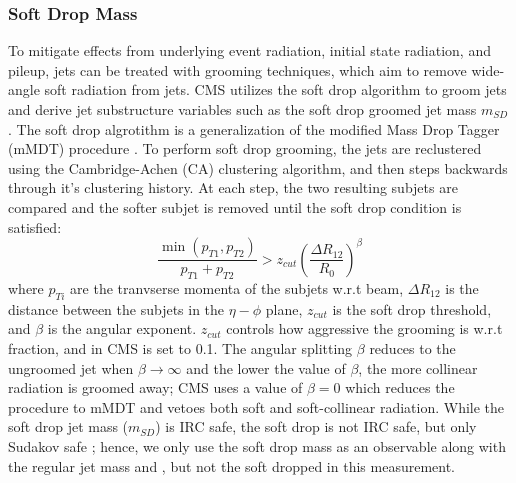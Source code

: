 \subsubsection{Soft Drop Mass}
To mitigate effects from underlying event radiation, initial state radiation, and pileup, jets can be treated with grooming techniques, which aim to remove wide-angle soft  radiation from jets. CMS utilizes the soft drop algorithm \cite{softdrop} to groom jets and derive jet substructure variables such as the soft drop groomed jet mass $m_{SD}$. The soft drop algrotithm is a generalization of the modified Mass Drop Tagger (mMDT) procedure \cite{mMDT}. To perform soft drop grooming, the jets are reclustered using the Cambridge-Achen (CA) \cite{CA} clustering algorithm, and then steps backwards through it's clustering history. At each step, the two resulting subjets are compared and the softer subjet is removed until the soft drop condition is satisfied:
\begin{equation}
\frac{\min(p_{T1},p_{T2})}{p_{T1}+p_{T2}}>z_{cut}\left(\frac{\Delta R_{12}}{R_0}\right)^\beta
\end{equation}
where $p_{Ti}$ are the tranvserse momenta of the subjets w.r.t beam, $\Delta R_{12}$ is the distance between the subjets in the $\eta-\phi$ plane, $z_{cut}$ is the soft drop threshold, and $\beta$ is the angular exponent. $z_{cut}$ controls how aggressive the grooming is w.r.t \pt fraction, and in CMS is set to 0.1. The angular splitting $\beta$ reduces to the ungroomed jet when $\beta\rightarrow\infty$ and the lower the value of $\beta$, the more collinear radiation is groomed away; CMS uses a value of $\beta=0$ which reduces the procedure to mMDT and vetoes both soft and soft-collinear radiation. While the soft drop jet mass ($m_{SD}$) is IRC safe, the soft drop \pt is not IRC safe, but only Sudakov safe \cite{advancesInJet}; hence, we only use the soft drop mass as an observable along with the regular jet mass and \pt, but not the soft dropped \pt in this measurement.
